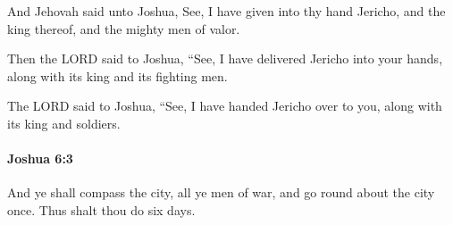 			\begin{versebox}
					\item[BHS] 
					\item[ASV] And Jehovah said unto Joshua, See, I have given into thy hand Jericho, and the king thereof, and the mighty men of valor.
					\item[NIV] Then the LORD said to Joshua, “See, I have delivered Jericho into your hands, along with its king and its fighting men.
					\item[NRSV] The LORD said to Joshua, “See, I have handed Jericho over to you, along with its king and soldiers.
			\end{versebox}

		\paragraph{Joshua 6:3} %
			\label{JOSHUA-6-3}

			And ye shall compass the city, all ye men of war, and go round about the city once. Thus shalt thou do six days.

